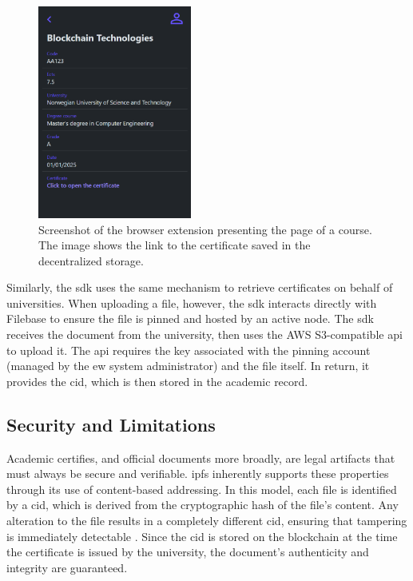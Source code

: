 \begin{figure}
  \centering
  \includegraphics[width=0.45\textwidth]{figures/SingleCourseWithCertificate.png}
  \caption[Browser extension screenshot with certificate link]{Screenshot of the browser extension presenting the page of a course. The image shows the link to the certificate saved in the decentralized storage.}
  \label{fig:courseWithCertificate}
\end{figure}

Similarly, the \acrshort{sdk} uses the same mechanism to retrieve certificates on behalf of universities. When uploading a file, however, the \acrshort{sdk} interacts directly with Filebase to ensure the file is pinned and hosted by an active node. The \acrshort{sdk} receives the document from the university, then uses the AWS S3-compatible \acrshort{api} to upload it. The \acrshort{api} requires the key associated with the pinning account (managed by the \acrshort{ew} system administrator) and the file itself. In return, it provides the \acrshort{cid}, which is then stored in the academic record.

\subsection{Security and Limitations}
Academic certifies, and official documents more broadly, are legal artifacts that must always be secure and verifiable. \acrshort{ipfs} inherently supports these properties through its use of content-based addressing. In this model, each file is identified by a \acrshort{cid}, which is derived from the cryptographic \gls{hash} of the file's content. Any alteration to the file results in a completely different \acrshort{cid}, ensuring that tampering is immediately detectable \cite{benet2014ipfscontentaddressed}. Since the \acrshort{cid} is stored on the blockchain at the time the certificate is issued by the university, the document's authenticity and integrity are guaranteed.

